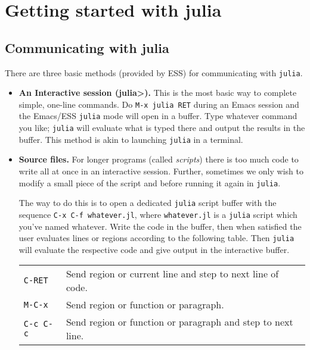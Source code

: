\documentclass[11pt]{article}
\begin{document}
\section[Getting started with julia]{Getting started with julia}
\label{sec-2}

\subsection[Communicating with julia]{Communicating with julia}
\label{sec-2-1}

There are three basic methods (provided by ESS) for communicating with
\texttt{julia}.

\begin{itemize}
\item \textbf{An Interactive session (julia>).} This is the most basic way to
complete simple, one-line commands. Do \texttt{M-x julia RET} during an
Emacs session and the Emacs/ESS \texttt{julia} mode will open in a buffer.
Type whatever command you like; \texttt{julia} will evaluate what is typed
there and output the results in the buffer.  This method is akin to
launching \texttt{julia} in a terminal.

\item \textbf{Source files.} For longer programs (called \emph{scripts}) there is too
much code to write all at once in an interactive session. Further,
sometimes we only wish to modify a small piece of the script and
before running it again in \texttt{julia}.

The way to do this is to open a dedicated \texttt{julia} script buffer with
the sequence \texttt{C-x C-f whatever.jl}, where \texttt{whatever.jl} is a \texttt{julia}
script which you've named whatever. Write the code in the buffer,
then when satisfied the user evaluates lines or regions according to
the following table. Then \texttt{julia} will evaluate the respective code
and give output in the interactive buffer.

\begin{center}
\begin{tabular}{ll}
\texttt{C-RET} & Send region or current line and step to next line of code.\\
\texttt{M-C-x} & Send region or function or paragraph.\\
\texttt{C-c C-c} & Send region or function or paragraph and step to next line.\\
\end{tabular}
\end{center}


\end{itemize}
\end{document}
